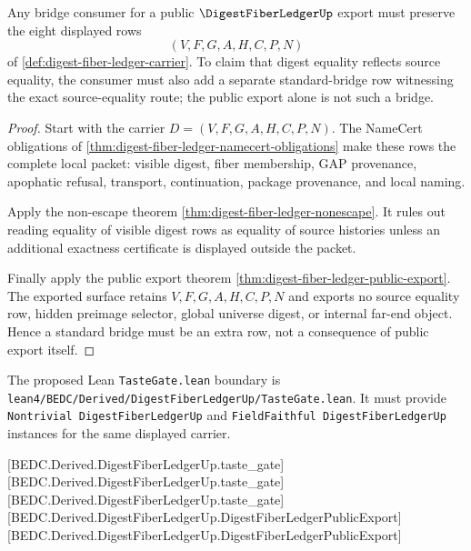 \begin{theorem}
\label{thm:digest-fiber-ledger-bridge-schema}
Any bridge consumer for a public $\DigestFiberLedgerUp$ export must preserve the eight displayed rows
$$
(V,F,G,A,H,C,P,N)
$$
of \autoref{def:digest-fiber-ledger-carrier}. To claim that digest equality reflects source equality, the consumer must also add a separate standard-bridge row witnessing the exact source-equality route; the public export alone is not such a bridge.
\end{theorem}
\begin{proof}
Start with the carrier $D=(V,F,G,A,H,C,P,N)$. The NameCert obligations of \autoref{thm:digest-fiber-ledger-namecert-obligations} make these rows the complete local packet: visible digest, fiber membership, GAP provenance, apophatic refusal, transport, continuation, package provenance, and local naming.

Apply the non-escape theorem \autoref{thm:digest-fiber-ledger-nonescape}. It rules out reading equality of visible digest rows as equality of source histories unless an additional exactness certificate is displayed outside the packet.

Finally apply the public export theorem \autoref{thm:digest-fiber-ledger-public-export}. The exported surface retains $V,F,G,A,H,C,P,N$ and exports no source equality row, hidden preimage selector, global universe digest, or internal far-end object. Hence a standard bridge must be an extra row, not a consequence of public export itself.
\end{proof}



The proposed Lean \texttt{TasteGate.lean} boundary is \texttt{lean4/BEDC/Derived/DigestFiberLedgerUp/TasteGate.lean}. It must provide \texttt{Nontrivial DigestFiberLedgerUp} and \texttt{FieldFaithful DigestFiberLedgerUp} instances for the same displayed carrier.

[BEDC.Derived.DigestFiberLedgerUp.taste\_gate]
[BEDC.Derived.DigestFiberLedgerUp.taste\_gate]
[BEDC.Derived.DigestFiberLedgerUp.taste\_gate]
[BEDC.Derived.DigestFiberLedgerUp.DigestFiberLedgerPublicExport]
[BEDC.Derived.DigestFiberLedgerUp.DigestFiberLedgerPublicExport]

